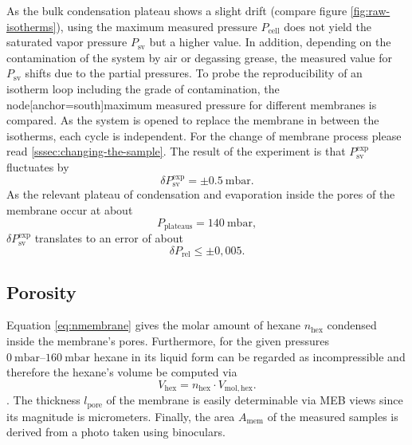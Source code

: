 \documentclass[../thesis.tex]{subfiles}
\begin{document}
            As the bulk condensation plateau shows a slight drift (compare figure \cref{fig:raw-isotherms}), using the maximum measured pressure $P_\mathrm{cell}$ does not yield the saturated vapor pressure $P_\mathrm{sv}$ but a higher value. In addition, depending on the contamination of the system by air or degassing grease, the measured value for $P_\mathrm{sv}$ shifts due to the partial pressures. To probe the reproducibility of an isotherm loop including the grade of contamination, the  node[anchor=south]maximum measured pressure for different membranes is compared. As the system is opened to replace the membrane in between the isotherms, each cycle is independent. For the change of membrane process please read \cref{sssec:changing-the-sample}. The result of the experiment is that $P_\mathrm{sv}^\mathrm{exp}$ fluctuates by
            \begin{equation}
                \delta P_\mathrm{sv}^\mathrm{exp} = \pm \SI{0,5}{\milli\bar}.
                \label{eq:delta-Psat}
            \end{equation}
            As the relevant plateau of condensation and evaporation inside the pores of the membrane occur at about
            \begin{equation}
                P_\mathrm{plateaus} = \SI{140}{\milli\bar},
            \end{equation}
            $\delta P_\mathrm{sv}^\mathrm{exp}$ translates to an error of about
            \begin{equation}
                \delta P_\mathrm{rel} \le \pm 0,005.
                \label{eq:delta-Prel}
            \end{equation}


        \subsection{Porosity}
        \label{subsec:porosity}

            Equation \cref{eq:nmembrane} gives the molar amount of hexane $n_\mathrm{hex}$ condensed inside the membrane's pores. Furthermore, for the given pressures $\SIrange{0}{160}{\milli\bar}$ hexane in its liquid form can be regarded as incompressible and therefore the hexane's volume be computed via
            \begin{equation*}
                V_\mathrm{hex} = n_\mathrm{hex} \cdot V_\mathrm{mol, hex}.
            \end{equation*}.
            The thickness $l_\mathrm{pore}$ of the membrane is easily determinable via MEB views since its magnitude is micrometers. Finally, the area $A_\mathrm{mem}$ of the measured samples is derived from a photo taken using binoculars.
\end{document}
